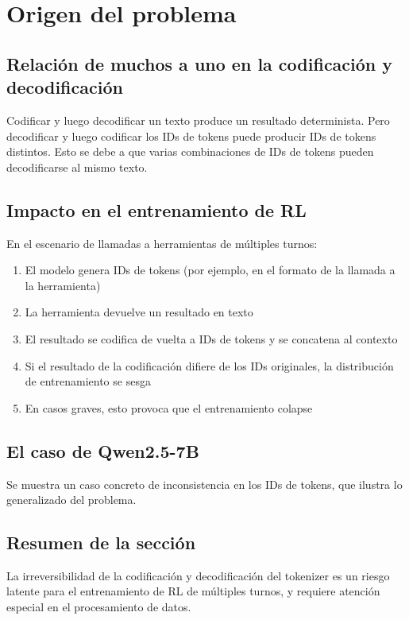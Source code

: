 \section{Origen del problema}
\subsection{Relación de muchos a uno en la codificación y decodificación}
Codificar y luego decodificar un texto produce un resultado determinista. Pero decodificar y luego codificar los IDs de tokens puede producir IDs de tokens distintos. Esto se debe a que varias combinaciones de IDs de tokens pueden decodificarse al mismo texto.

\subsection{Impacto en el entrenamiento de RL}
En el escenario de llamadas a herramientas de múltiples turnos:
\begin{enumerate}
  \item El modelo genera IDs de tokens (por ejemplo, en el formato de la llamada a la herramienta)
  \item La herramienta devuelve un resultado en texto
  \item El resultado se codifica de vuelta a IDs de tokens y se concatena al contexto
  \item Si el resultado de la codificación difiere de los IDs originales, la distribución de entrenamiento se sesga
  \item En casos graves, esto provoca que el entrenamiento colapse
\end{enumerate}

\subsection{El caso de Qwen2.5-7B}
Se muestra un caso concreto de inconsistencia en los IDs de tokens, que ilustra lo generalizado del problema.

\subsection{Resumen de la sección}
La irreversibilidad de la codificación y decodificación del tokenizer es un riesgo latente para el entrenamiento de RL de múltiples turnos, y requiere atención especial en el procesamiento de datos.

\newpage
